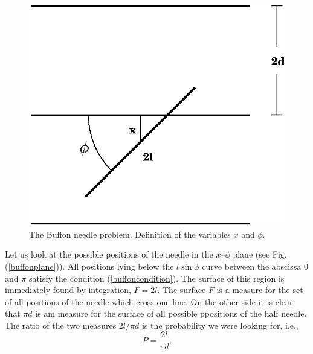 \begin{figure}
\label{buffondefinition}
\includegraphics{Figures/buffondefinition.eps}
\caption{The Buffon needle problem. Definition of the variables $x$
  and $\phi$.}
\end{figure}

Let us look at the possible positions of the needle in the $x$--$\phi$
plane (see Fig. (\ref{buffonplane})). All positions lying below the
$l\sin \phi$ curve between the abscissa 0 and $\pi$ satisfy the
condition (\ref{buffoncondition}). The surface of this region is
immediately found by integration, $F=2l$. The surface $F$ is a measure
for the set of all positions of the needle which cross one line. On
the other side it is clear that $\pi d$ is am measure for the surface
of all possible ppositions of the half needle. The ratio of the two
measures $ 2l/\pi d$ is the probability we were looking for, i.e.,
\begin{equation}
\label{buffonprobability}
P = \frac{2 l}{\pi d}.
\end{equation}

